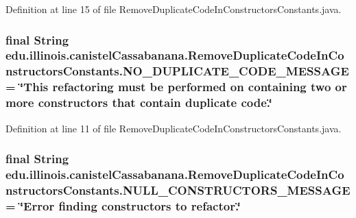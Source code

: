 Definition at line 15 of file RemoveDuplicateCodeInConstructorsConstants.java.

\hypertarget{classedu_1_1illinois_1_1canistelCassabanana_1_1RemoveDuplicateCodeInConstructorsConstants_a690b7d9efb6cfe6f9bb3b0cfbc9ba58f}{
\subsubsection[{NO\_\-DUPLICATE\_\-CODE\_\-MESSAGE}]{\setlength{\rightskip}{0pt plus 5cm}final String {\bf edu.illinois.canistelCassabanana.RemoveDuplicateCodeInConstructorsConstants.NO\_\-DUPLICATE\_\-CODE\_\-MESSAGE} = \char`\"{}This refactoring must be performed on containing two or more constructors that contain duplicate code.\char`\"{}}}
\label{classedu_1_1illinois_1_1canistelCassabanana_1_1RemoveDuplicateCodeInConstructorsConstants_a690b7d9efb6cfe6f9bb3b0cfbc9ba58f}


Definition at line 11 of file RemoveDuplicateCodeInConstructorsConstants.java.

\hypertarget{classedu_1_1illinois_1_1canistelCassabanana_1_1RemoveDuplicateCodeInConstructorsConstants_a2e0637b8a100de734054aff8b12c62b7}{
\subsubsection[{NULL\_\-CONSTRUCTORS\_\-MESSAGE}]{\setlength{\rightskip}{0pt plus 5cm}final String {\bf edu.illinois.canistelCassabanana.RemoveDuplicateCodeInConstructorsConstants.NULL\_\-CONSTRUCTORS\_\-MESSAGE} = \char`\"{}Error finding constructors to refactor.\char`\"{}}}
\label{classedu_1_1illinois_1_1canistelCassabanana_1_1RemoveDuplicateCodeInConstructorsConstants_a2e0637b8a100de734054aff8b12c62b7}


